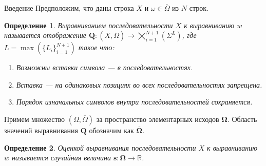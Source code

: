 \documentclass[ucs, notheorems, handout, 10pt]{beamer}
\newtheorem{defenition}{Определение}
\begin{document}
	\begin{frame}{Введение}					
		Предположим, что даны строка $X$ и $\omega \in \overline{\Omega}$ из $N$ строк. 
		
		\begin{defenition}
			Выравниванием последовательности $X$ к выравниванию $w$ называется отображение $\boldsymbol{Q}: (X, \overline{\Omega}) \rightarrow \bigtimes_{i=1}^{N+1}(\Sigma^{L})$, где $L = \max(\{L_i\}_{i=1}^{N+1})$ такое что:
			\begin{enumerate}
				\item Возможны вставки символа --- в последовательностях.
				\item Вставка --- на одинаковых позициях во всех последовательностях запрещена.
				\item Порядок изначальных символов внутри последовательностей сохраняется.
			\end{enumerate}
		\end{defenition}
		
		Примем множество $(\Omega, \overline \Omega)$ за пространство элементарных исходов $\boldsymbol{\Omega}$. Область значений выравнивания $\boldsymbol Q$ обозначим как $\overline{\boldsymbol{\Omega}}$.
		
		\begin{defenition}				
			Оценкой выравнивания последовательности $X$ к выравниванию $w$ называется случайная величина $\boldsymbol s:\overline{\boldsymbol{\Omega}} \rightarrow \mathbb{R}$.
		\end{defenition}				
		
	\end{frame}
\end{document}
